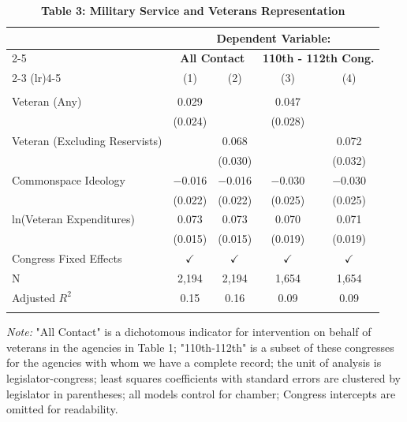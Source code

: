 \documentclass[12pt,letterpaper]{article}
\begin{document}
	

\begin{table}[ht]
	\centering
	\begin{threeparttable}
		\caption{\textbf{Table 3: Military Service and Veterans Representation}}
		\label{tab3}
		\begin{tabular}{l@{\hspace{3cm}}cccc} 
			\hline 
			\hline
			& \multicolumn{4}{c}{\textbf{Dependent Variable:}} \\ 
			\cline{2-5} 
			& \multicolumn{2}{c}{\textbf{All Contact}} &  \multicolumn{2}{c}{\textbf{110th - 112th Cong.}}\\ 
			\cmidrule(lr){2-3} 
			\cmidrule(lr){4-5}
			& (1) & (2) & (3) & (4)\\ 
			\hline \\[-1.8ex] 
			Veteran (Any) & 0.029 &  & 0.047 &  \\ 
			& (0.024) &  & (0.028) &  \\ 
			Veteran (Excluding Reservists) &  & 0.068 &  & 0.072 \\ 
			&  & (0.030) &  & (0.032) \\ 
			Commonspace Ideology & $-$0.016 & $-$0.016 & $-$0.030 & $-$0.030 \\ 
			& (0.022) & (0.022) & (0.025) & (0.025) \\ 
			ln(Veteran Expenditures) & 0.073 & 0.073 & 0.070 & 0.071 \\ 
			& (0.015) & (0.015) & (0.019) & (0.019) \\ 
			Congress Fixed Effects & $\checkmark$ & $\checkmark$ & $\checkmark$  & $\checkmark$ \\ 
			N & 2,194 & 2,194 & 1,654 & 1,654 \\ 
			Adjusted $R^2$ & 0.15 & 0.16 & 0.09 & 0.09 \\ 
			\hline 
			\hline \\[-1.8ex] 
		\end{tabular}
		\begin{tablenotes}[flushleft]\small
			\item \textit{Note:} "All Contact" is a dichotomous indicator for intervention on behalf of veterans in the agencies in Table 1; "110th-112th" is a
			subset of these congresses for the agencies with whom we have a complete record; the unit of analysis is legislator-congress; least squares
			coefficients with standard errors are clustered by legislator in parentheses; all models control for chamber; Congress intercepts are omitted
			for readability.
		\end{tablenotes}
		\end{threeparttable}
	\end{table}
	
\end{document}
